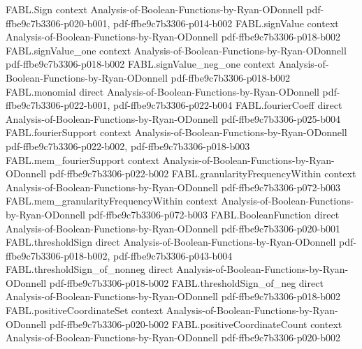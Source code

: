 \begin{theorem}
\label{FABL.eq_const_or_signedDictator_of_isKJunta_one}
\leanok
{}
\proofstep
  {FABL.Sign}
  {context}
  {Analysis-of-Boolean-Functions-by-Ryan-ODonnell}
  {pdf-ffbe9c7b3306-p020-b001,
    pdf-ffbe9c7b3306-p014-b002}
\proofstep
  {FABL.signValue}
  {context}
  {Analysis-of-Boolean-Functions-by-Ryan-ODonnell}
  {pdf-ffbe9c7b3306-p018-b002}
\proofstep
  {FABL.signValue_one}
  {context}
  {Analysis-of-Boolean-Functions-by-Ryan-ODonnell}
  {pdf-ffbe9c7b3306-p018-b002}
\proofstep
  {FABL.signValue_neg_one}
  {context}
  {Analysis-of-Boolean-Functions-by-Ryan-ODonnell}
  {pdf-ffbe9c7b3306-p018-b002}
\proofstep
  {FABL.monomial}
  {direct}
  {Analysis-of-Boolean-Functions-by-Ryan-ODonnell}
  {pdf-ffbe9c7b3306-p022-b001,
    pdf-ffbe9c7b3306-p022-b004}
\proofstep
  {FABL.fourierCoeff}
  {direct}
  {Analysis-of-Boolean-Functions-by-Ryan-ODonnell}
  {pdf-ffbe9c7b3306-p025-b004}
\proofstep
  {FABL.fourierSupport}
  {context}
  {Analysis-of-Boolean-Functions-by-Ryan-ODonnell}
  {pdf-ffbe9c7b3306-p022-b002,
    pdf-ffbe9c7b3306-p018-b003}
\proofstep
  {FABL.mem_fourierSupport}
  {context}
  {Analysis-of-Boolean-Functions-by-Ryan-ODonnell}
  {pdf-ffbe9c7b3306-p022-b002}
\proofstep
  {FABL.granularityFrequencyWithin}
  {context}
  {Analysis-of-Boolean-Functions-by-Ryan-ODonnell}
  {pdf-ffbe9c7b3306-p072-b003}
\proofstep
  {FABL.mem_granularityFrequencyWithin}
  {context}
  {Analysis-of-Boolean-Functions-by-Ryan-ODonnell}
  {pdf-ffbe9c7b3306-p072-b003}
\proofstep
  {FABL.BooleanFunction}
  {direct}
  {Analysis-of-Boolean-Functions-by-Ryan-ODonnell}
  {pdf-ffbe9c7b3306-p020-b001}
\proofstep
  {FABL.thresholdSign}
  {direct}
  {Analysis-of-Boolean-Functions-by-Ryan-ODonnell}
  {pdf-ffbe9c7b3306-p018-b002,
    pdf-ffbe9c7b3306-p043-b004}
\proofstep
  {FABL.thresholdSign_of_nonneg}
  {direct}
  {Analysis-of-Boolean-Functions-by-Ryan-ODonnell}
  {pdf-ffbe9c7b3306-p018-b002}
\proofstep
  {FABL.thresholdSign_of_neg}
  {direct}
  {Analysis-of-Boolean-Functions-by-Ryan-ODonnell}
  {pdf-ffbe9c7b3306-p018-b002}
\proofstep
  {FABL.positiveCoordinateSet}
  {context}
  {Analysis-of-Boolean-Functions-by-Ryan-ODonnell}
  {pdf-ffbe9c7b3306-p020-b002}
\proofstep
  {FABL.positiveCoordinateCount}
  {context}
  {Analysis-of-Boolean-Functions-by-Ryan-ODonnell}
  {pdf-ffbe9c7b3306-p020-b002}

\end{theorem}
